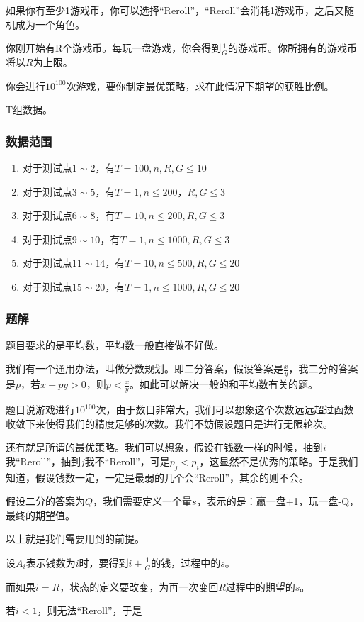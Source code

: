 \documentclass{ctexart}
\begin{document}
如果你有至少1游戏币，你可以选择“Reroll”，“Reroll”会消耗1游戏币，之后又随机成为一个角色。

你刚开始有R个游戏币。每玩一盘游戏，你会得到$\frac{1}{G}$的游戏币。你所拥有的游戏币将以$R$为上限。

你会进行$10^{100}$次游戏，要你制定最优策略，求在此情况下期望的获胜比例。

T组数据。
\subsubsection{数据范围}
\begin{enumerate}
\item 对于测试点$1 \sim 2$，有$T=100,n,R,G \le 10$
\item 对于测试点$3 \sim 5$，有$T=1,n \le 200，R,G \le 3$
\item 对于测试点$6 \sim 8$，有$T=10,n \le 200,R,G \le 3$
\item 对于测试点$9 \sim 10$，有$T=1,n \le 1000,R,G \le 3$
\item 对于测试点$11 \sim 14$，有$T=10,n \le 500,R,G \le 20$
\item 对于测试点$15 \sim 20$，有$T=1,n \le 1000,R,G \le 20$
\end{enumerate}
\subsubsection{题解}
题目要求的是平均数，平均数一般直接做不好做。

我们有一个通用办法，叫做分数规划。即二分答案，假设答案是$\frac{x}{y}$，我二分的答案是$p$，若$x-py>0$，则$p<\frac{x}{y}$。如此可以解决一般的和平均数有关的题。

题目说游戏进行$10^{100}$次，由于数目非常大，我们可以想象这个次数远远超过函数收敛下来使得我们的精度足够的次数。我们不妨假设题目是进行无限轮次。

还有就是所谓的最优策略。我们可以想象，假设在钱数一样的时候，抽到$i$我``Reroll''，抽到$j$我不``Reroll''，可是$p_j<p_i$，这显然不是优秀的策略。于是我们知道，假设钱数一定，一定是最弱的几个会``Reroll''，其余的则不会。

假设二分的答案为$Q$，我们需要定义一个量$s$，表示的是：赢一盘+1，玩一盘-Q，最终的期望值。

以上就是我们需要用到的前提。

设$A_i$表示钱数为$i$时，要得到$i+\frac{1}{G}$的钱，过程中的$s$。

而如果$i=R$，状态的定义要改变，为再一次变回$R$过程中的期望的$s$。

若$i<1$，则无法``Reroll''，于是
	
\end{document}
